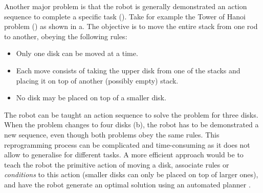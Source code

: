 Another major problem is that the robot is generally demonstrated an action sequence to complete a specific task (\cite{orendt2016robot,peppoloni2014ros}).
Take for example the Tower of Hanoi problem (\cite{douglas1985metamagical}) as shown in a.
The objective is to move the entire stack from one rod to another, obeying the following rules:
\begin{itemize}
\item Only one disk can be moved at a time.
\item Each move consists of taking the upper disk from one of the stacks and placing it on top of another (possibly empty) stack.
\item No disk may be placed on top of a smaller disk.
\end{itemize}

The robot can be taught an action sequence to solve the problem for three disks.
When the problem changes to four disks (b), the robot has to be demonstrated a new sequence, even though both problems obey the same rules.
This reprogramming process can be complicated and time-consuming as it does not allow to generalise for different tasks.
A more efficient approach would be to teach the robot the primitive action of moving a disk, associate rules or \textit{conditions} to this action (\eg smaller disks can only be placed on top of larger ones), and have the robot generate an optimal solution using an automated planner \cite{ghallab2004automated}.


